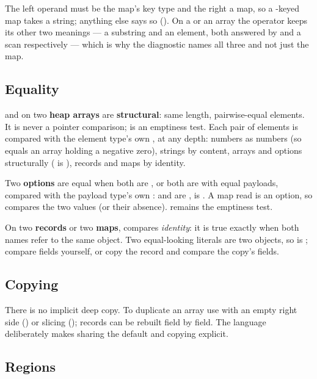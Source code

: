 \noindent The left operand must be the map's key type and the right a
map, so a -keyed map takes a string; anything else says so
(). On a
 or an array the operator keeps its other two meanings --- a
substring and an element, both answered by  and a scan
respectively --- which is why the diagnostic names all three and not
just the map.

\subsection{Equality}
\label{sec:equality}

\ic{==} and \ic{!=} on two \textbf{heap arrays} \ic{[T]} are
\textbf{structural}: same
length, pairwise-equal elements. It is never a pointer comparison;
 is an emptiness test. Each pair of elements is compared
with the element type's own \ic{==}, at any depth: numbers as numbers
(so \ic{[0.0]} equals an array holding a negative zero), strings by
content, arrays and options structurally (\ic{[[1, 2]] == [[1, 2]]} is
), records and maps by identity.

Two \textbf{options} are equal when both are , or both are
 with equal payloads, compared with the payload type's own
\ic{==}:  and  are ,  is . A map
read is an option, so  compares the two values (or
their absence).  remains the emptiness test.

On two \textbf{records} or two \textbf{maps}, \ic{==} compares
\emph{identity}: it is true exactly when both names refer to the same
object. Two equal-looking literals are two objects, so  is ; compare fields yourself, or copy the record and
compare the copy's fields.

\subsection{Copying}

There is no implicit deep copy. To duplicate an array use \ic{+} with an
empty right side () or slicing (); records can be
rebuilt field by field. The language deliberately makes sharing the
default and copying explicit.

\subsection{Regions}
\label{sec:regions}

